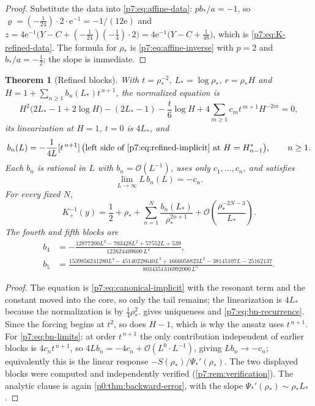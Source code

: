 \documentclass[11pt,a4paper,oneside]{book}
\theoremstyle{plain}
\newtheorem{theorem}{Theorem}[chapter]
\theoremstyle{definition}
\theoremstyle{remark}
\newcommand{\e}{\mathrm{e}}
\newcommand{\Coef}[1]{[#1]\,}
\newcommand{\bigO}{\mathcal{O}}
\begin{document}
\begin{proof}
Substitute the data into \eqref{p7:eq:affine-data}:
$pb_{*}/a=-1$, so $\varrho=(-\tfrac1{24})\cdot2\cdot\e^{-1}=-1/(12\e)$ and
$z=4\e^{-1}\bigl(Y-C+(-\tfrac1{24})(-\tfrac14)\cdot2\bigr)
=4\e^{-1}\bigl(Y-C+\tfrac1{48}\bigr)$, which is
\eqref{p7:eq:K-refined-data}.  The formula for $\rho_{*}$ is
\eqref{p7:eq:affine-inverse} with $p=2$ and $b_{*}/a=-\tfrac12$; the slope is
immediate.
\end{proof}

\begin{theorem}[Refined blocks]\label{p7:thm:refined}
With $t=\rho_{*}^{-2}$, $L_{*}=\log\rho_{*}$, $r=\rho_{*}H$ and
$H=1+\sum_{n\ge1}b_n(L_{*})t^{\,n+1}$, the normalized equation is
\begin{equation}\label{p7:eq:refined-implicit}
 H^{2}\bigl(2L_{*}-1+2\log H\bigr)-(2L_{*}-1)
 -\frac t6\log H
 +4\sum_{m\ge1}c_mt^{\,m+1}H^{-2m}=0,
\end{equation}
its linearization at $H=1$, $t=0$ is $4L_{*}$, and
\begin{equation}\label{p7:eq:bn-recurrence}
 b_n(L)=-\frac1{4L}\Coef{t^{\,n+1}}\bigl(\text{left side of
 \eqref{p7:eq:refined-implicit} at }H=H^{*}_{n-1}\bigr),
 \qquad n\ge1 .
\end{equation}
Each $b_n$ is rational in $L$ with $b_n=\bigO(L^{-1})$, uses only
$c_1,\dots,c_n$, and satisfies
\begin{equation}\label{p7:eq:bn-limits}
 \lim_{L\to\infty}L\,b_n(L)=-c_n .
\end{equation}
For every fixed $N$,
\begin{equation}\label{p7:eq:refined-main}
 K_+^{-1}(y)=\frac12+\rho_{*}+\sum_{n=1}^{N}\frac{b_n(L_{*})}{\rho_{*}^{2n+1}}
 +\bigO\!\left(\frac{\rho_{*}^{-2N-3}}{L_{*}}\right).
\end{equation}
The fourth and fifth blocks are
\begin{align}
 b_4&=-\frac{12877200L^{3}-703428L^{2}+57552L+539}{122624409600\,L^{4}},
 \label{p7:eq:b4}\\
 b_5&=\frac{1539856241280L^{4}-45140228640L^{3}+1666058823L^{2}
 -38145107L-25162137}{8034351316992000\,L^{5}} .
 \label{p7:eq:b5}
\end{align}
\end{theorem}

\begin{proof}
The equation is \eqref{p7:eq:canonical-implicit} with the resonant term and
the constant moved into the core, so only the tail remains; the linearization
is $4L_{*}$ because the normalization is by $\tfrac14\rho_{*}^{2}$.
 gives uniqueness and
\eqref{p7:eq:bn-recurrence}.  Since the forcing begins at $t^{2}$, so does
$H-1$, which is why the ansatz uses $t^{\,n+1}$.  For
\eqref{p7:eq:bn-limits}: at order $t^{\,n+1}$ the only contribution
independent of earlier blocks is $4c_nt^{\,n+1}$, so
$4Lb_n=-4c_n+\bigO(L^{0}\cdot L^{-1})$, giving $Lb_n\to-c_n$; equivalently
this is the linear response $-S(\rho_{*})/\Psi_{\!*}'(\rho_{*})$.  The two
displayed blocks were computed and independently verified
(\cref{p7:rem:verification}).  The analytic clause is again
\cref{p0:thm:backward-error}, with the slope
$\Psi_{\!*}'(\rho_{*})\sim\rho_{*}L_{*}$.
\end{proof}
\end{document}
